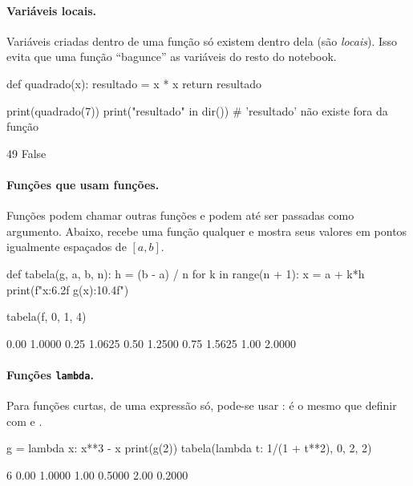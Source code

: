 \paragraph{Variáveis locais.} Variáveis criadas dentro de uma função só existem dentro dela (são
\emph{locais}). Isso evita que uma função ``bagunce'' as variáveis do resto do notebook.

\begin{entrada}
def quadrado(x):
    resultado = x * x
    return resultado

print(quadrado(7))
print("resultado" in dir())    # 'resultado' não existe fora da função
\end{entrada}
\begin{saida}
49
False
\end{saida}

\paragraph{Funções que usam funções.} Funções podem chamar outras funções e podem até ser passadas como
argumento. Abaixo,  recebe uma função  qualquer e mostra seus valores em pontos igualmente
espaçados de $[a,b]$.

\begin{entrada}
def tabela(g, a, b, n):
    h = (b - a) / n
    for k in range(n + 1):
        x = a + k*h
        print(f"{x:6.2f} {g(x):10.4f}")

tabela(f, 0, 1, 4)
\end{entrada}
\begin{saida}
  0.00     1.0000
  0.25     1.0625
  0.50     1.2500
  0.75     1.5625
  1.00     2.0000
\end{saida}

\paragraph{Funções \texttt{lambda}.} Para funções curtas, de uma expressão só, pode-se usar :
 é o mesmo que definir  com  e .

\begin{entrada}
g = lambda x: x**3 - x
print(g(2))
tabela(lambda t: 1/(1 + t**2), 0, 2, 2)
\end{entrada}
\begin{saida}
6
  0.00     1.0000
  1.00     0.5000
  2.00     0.2000
\end{saida}

